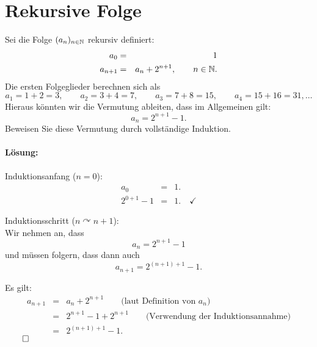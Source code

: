 \documentclass[
				a4paper,
				10pt
			]
			{scrartcl}
\begin{document}
\newpage
\section{Rekursive Folge}
Sei die Folge $(a_n)_{n\in \mathbb{N}}$ rekursiv definiert:
\begin{eqnarray*}
	a_0 		&=& 1\\
	a_{n+1}	&=& a_n + 2^{n+1}, \qquad n\in \mathbb{N}.
\end{eqnarray*}
Die ersten Folgeglieder berechnen sich als
$$
	a_1 = 1+2= 3, \qquad a_2 = 3+4= 7, \qquad a_3 = 7 + 8 =15,\qquad a_4 = 15 + 16 = 31, \ldots
$$
Hieraus k\"onnten wir die Vermutung ableiten, dass im Allgemeinen gilt:
$$
	a_n = 2^{n+1} - 1.
$$
Beweisen Sie diese Vermutung durch vollst\"andige Induktion.

\paragraph{L\"osung:}

Induktionsanfang ($n=0$):
\begin{eqnarray*}
	a_0 &=& 1.\\
	2^{0+1}-1 &=& 1. \quad\checkmark
\end{eqnarray*}

Induktionsschritt ($n \curvearrowright n+1$): \\
Wir nehmen an, dass 
$$
	a_n = 2^{n+1} - 1
$$
und m\"ussen folgern, dass dann auch
$$
	a_{n+1} = 2^{(n+1)+1} - 1.
$$

Es gilt:
\begin{eqnarray*}
	a_{n+1} &=& a_n + 2^{n+1} \qquad \text{(laut Definition von $a_n$)}\\
		     &=& 2^{n+1} - 1 + 2^{n+1} \qquad \text{(Verwendung der Induktionsannahme)}\\
		     &=& 2^{(n+1) + 1} - 1.	
\end{eqnarray*}
\hfill$\qed$
\end{document}
